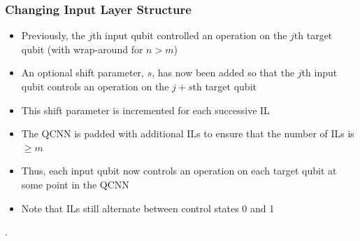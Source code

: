 \documentclass{beamer}
\begin{document}
\begin{frame}
\frametitle{Changing Input Layer Structure}
\begin{itemize}
\item Previously, the $j$th input qubit controlled an operation on the $j$th target qubit (with wrap-around for $n >m$) 
\item An optional \alert{shift parameter}, $s$, has now been added so that the $j$th input qubit controls an operation on the $j+s$th target qubit 
\item This shift parameter is incremented for each successive IL 
\item The QCNN is padded with additional ILs to ensure that the number of ILs is $\geq m$ 
\item Thus, \alert{each input qubit now controls an operation on each target qubit} at some point in the QCNN 
\item Note that ILs still alternate between control states 0 and 1
\end{itemize}.
\end{frame}
\end{document}
